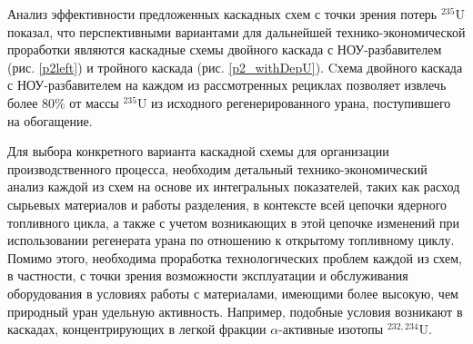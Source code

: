 Анализ эффективности предложенных каскадных схем с точки зрения потерь $^{235}$U показал, что перспективными вариантами для дальнейшей технико-экономической проработки являются каскадные схемы двойного каскада с НОУ-разбавителем (рис. \ref{p2left}) и тройного каскада (рис. \ref{p2_withDepU}). Cхема двойного каскада с НОУ-разбавителем на каждом из рассмотренных рециклах позволяет извлечь более 80\% от массы $^{235}$U из исходного регенерированного урана, поступившего на обогащение.


Для выбора конкретного варианта каскадной схемы для организации производственного процесса, необходим детальный технико-экономический анализ каждой из схем на основе их интегральных показателей, таких как расход сырьевых материалов и работы разделения, в контексте всей цепочки ядерного топливного цикла, а также с учетом возникающих в этой цепочке изменений при использовании регенерата урана по отношению к открытому топливному циклу. Помимо этого, необходима проработка технологических проблем каждой из схем, в частности, с точки зрения возможности эксплуатации и обслуживания оборудования в условиях работы с материалами, имеющими более высокую, чем природный уран удельную активность. Например, подобные условия возникают в каскадах, концентрирующих в легкой фракции $\alpha$-активные изотопы $^{232,234}$U.

\clearpage


